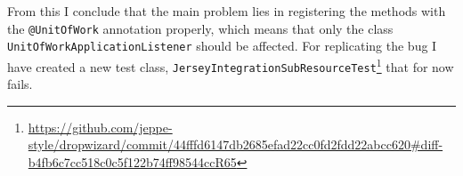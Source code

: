 \documentclass[11pt]{article}
\begin{document}
From this I conclude that the main problem lies in registering the methods with the \texttt{@UnitOfWork} annotation properly, which means that only the class \texttt{UnitOfWorkApplicationListener} should be affected. For replicating the bug I have created a new test class, \texttt{JerseyIntegrationSubResourceTest}\footnote{\url{https://github.com/jeppe-style/dropwizard/commit/44fffd6147db2685efad22cc0fd2fdd22abcc620#diff-b4fb6c7cc518c0c5f122b74ff98544ccR65}} that for now fails.
\end{document}
